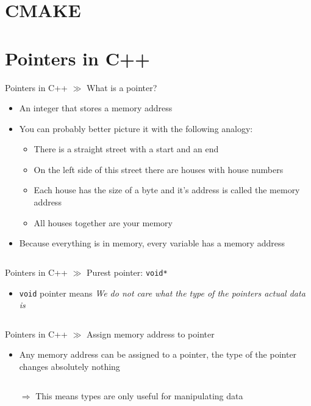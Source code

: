 \documentclass[10pt]{beamer}
\begin{document}
\section{CMAKE}

\section{Pointers in C++}

\begin{frame}{Pointers in C++ $\gg$ What is a pointer?}
\begin{itemize}
	\item An integer that stores a memory address
	\item You can probably better picture it with the following analogy:
	\begin{itemize}
		\item There is a straight street with a start and an end
		\item On the left side of this street there are houses with house numbers
		\item Each house has the size of a byte and it's address is called the memory address
		\item All houses together are your memory
	\end{itemize}
	\item Because everything is in memory, every variable has a memory address
	\inputminted[bgcolor=lightGreyCustom,fontsize=\scriptsize]{cpp}{./resources/memory_address.cpp}
\end{itemize}
\end{frame}

\begin{frame}{Pointers in C++ $\gg$ Purest pointer: \texttt{void*}}
\begin{itemize}
	\item \texttt{void} pointer means \textit{We do not care what the type of the pointers actual data is}
	\inputminted[bgcolor=lightGreyCustom,fontsize=\scriptsize]{cpp}{./resources/void_ptr.cpp}
\end{itemize}
\end{frame}

\begin{frame}{Pointers in C++ $\gg$ Assign memory address to pointer}
\begin{itemize}
	\item Any memory address can be assigned to a pointer, the type of the pointer changes absolutely nothing
	\inputminted[bgcolor=lightGreyCustom,fontsize=\scriptsize]{cpp}{./resources/assign_ptr.cpp}
	\item[$\Rightarrow$] This means types are only useful for manipulating data
\end{itemize}
\end{frame}
\end{document}
